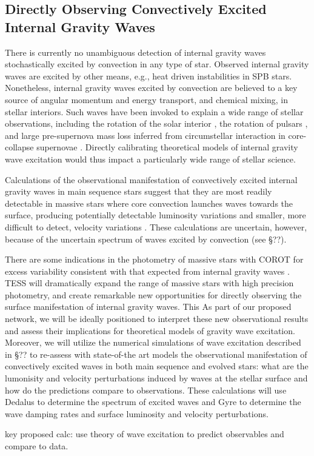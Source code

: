 \color{blue}
\subsection{Directly Observing Convectively Excited Internal Gravity Waves}

There is currently no unambiguous detection of  internal gravity waves stochastically excited by convection in any type of star.  Observed internal gravity waves  are excited by other means, e.g., heat driven instabilities in SPB stars. Nonetheless, internal gravity waves excited by convection are believed to a key source of angular momentum and energy transport, and chemical mixing, in stellar interiors.   Such waves have been invoked to explain a wide range of stellar observations, including the rotation of the solar interior \citep{kumar1999}, the rotation of pulsars \citep{fuller2015}, and large pre-supernova mass loss inferred from circumstellar interaction in core-collapse supernovae \citep{qs2012}.   Directly calibrating theoretical models of internal gravity wave excitation would thus impact a particularly wide range of stellar science.

Calculations of the observational manifestation of convectively excited internal gravity waves in main sequence stars suggest that they are most readily detectable in massive stars where core convection launches waves towards the surface, producing potentially detectable luminosity variations and smaller, more difficult to detect, velocity variations \citep{samadi2010,shiode2013}.   These calculations are uncertain, however, because of the uncertain spectrum of waves excited by convection (see \S ??).

There are some indications in the photometry of massive stars with COROT for excess variability consistent with that expected from internal gravity waves \citep{aerts2015}.   TESS will dramatically expand the range of massive stars with high precision photometry, and create remarkable new opportunities for directly observing the surface manifestation of internal gravity waves.   This   
As part of our proposed network, we will be ideally positioned to interpret these new observational results and assess their implications for theoretical models of gravity wave excitation.   Moreover, we will utilize the numerical simulations of wave excitation described in \S ?? to re-assess with state-of-the art models the observational manifestation of convectively excited waves in both main sequence and evolved stars:   what are the lumonisity and velocity perturbations induced by waves at the stellar surface and how do the predictions compare to observations.  These calculations will use Dedalus to determine the spectrum of excited waves and Gyre to determine the wave damping rates and surface luminosity and velocity perturbations.   

key proposed calc:   use theory of wave excitation to predict observables and compare to data.

